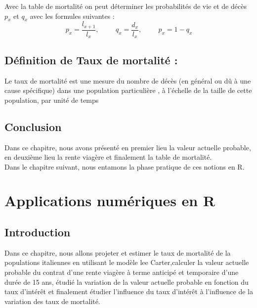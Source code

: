 \documentclass[french]{report}
\begin{document}
\newline Avec la table de mortalité on peut déterminer les probabilités de vie et de décès $p_{x}$ et $q_{x}$ avec les formules suivantes :
 \[p_{x}= \frac{l_{x+1}}{l_{x}} ,\hspace{1cm} q_{x}= \frac{d_{x}}{l_{x}} ,\hspace{1cm} p_{x} =  1- q_{x}\]  



\section {Définition de Taux de mortalité :}
Le taux de mortalité est une mesure du nombre de décès (en général ou dû à une cause spécifique) dans une population particulière , à l'échelle de la taille de cette population, par unité de temps


\section{Conclusion}
Dans ce chapitre, nous avons présenté en premier lieu la valeur actuelle probable, en deuxième lieu la rente viagère et finalement la table de mortalité.\\Dans le chapitre suivant, nous entamons la phase pratique de ces notions en R.
\newpage

\chapter{Applications numériques en R}
\section{Introduction}
Dans ce chapitre, nous allons projeter et estimer le taux de mortalité de la  populations italiennes en utilisant le modèle lee Carter,calculer la valeur actuelle probable du contrat d'une rente viagère à terme anticipé et temporaire d'une durée de 15 ans, étudié la variation de la valeur actuelle probable en fonction du taux d'intérêt et finalement étudier l'influence du taux d'intérêt à l'influence de la variation des taux de mortalité.  
\end{document}
